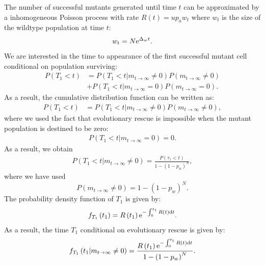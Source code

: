 \documentclass[12pt]{extarticle}
\renewcommand{\d}{{\rm d}}
\newcommand{\e}{{\rm e}}
\begin{document}

The number of successful mutants generated until time $t$ can be approximated by a inhomogeneous Poisson process with rate $R\left(t\right)=up_aw_t$
where $w_t$ is the size of the wildtype population at time $t$: 
\begin{equation}
w_t=N\e^{\Delta_wt}.
\end{equation}
We are interested in the time to appearance of the first successful mutant cell conditional on population surviving:
\begin{align*}
P\left(T_1<t\right)&=P\left(T_1<t|m_{t\rightarrow\infty}\neq0\right)P\left(m_{t\rightarrow\infty}\neq0\right)\\
&+P\left(T_1<t|m_{t\rightarrow\infty}=0\right)P\left(m_{t\rightarrow\infty}=0\right).
\end{align*}
As a result, the cumulative distribution function can be written as:
\begin{align*}
P\left(T_1<t\right)&=P\left(T_1<t|m_{t\rightarrow\infty}\neq0\right)P\left(m_{t\rightarrow\infty}\neq0\right),
\end{align*}
where we used the fact that evolutionary rescue is impossible when the mutant population is destined to be zero:
\begin{align*}
P\left(T_1<t|m_{t\rightarrow\infty}=0\right)=0.
\end{align*}
As a result, we obtain 
\begin{align}
P\left(T_1<t|m_{t\rightarrow\infty}\neq0\right)=\frac{P\left(\tau_1<t\right)}{1-\left(1-p_w\right)^N},
\end{align}
where we have used
\begin{equation}
P\left(m_{t\rightarrow\infty}\neq0\right)=1-\left(1-p_w\right)^N.
\end{equation}
The probability density function of $T_1$ is given by:
\begin{align}
f_{T_1}\left(t_1\right)=R\left(t_1\right)\e^{-\int_0^{t_1} R(t)\d t}.
\end{align}
As a result, the time $T_1$ conditional on evolutionary rescue is given by:
\begin{align}
f_{T_1}\left(t_1|m_{t\rightarrow\infty}\neq0\right)=\frac{R\left(t_1\right)\e^{-\int_0^{t_1} R(t)\d t}}{1-\left(1-p_w\right)^N}.
\end{align}
\end{document}
